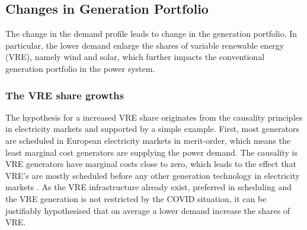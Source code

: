 \documentclass[energies,article,submit,moreauthors,pdftex]{Definitions/mdpi}
\begin{document}



\subsection{Changes in Generation Portfolio}\label{sec:Generation portfolio}
The change in the demand profile leads to change in the generation portfolio. In particular, the lower demand enlarge the shares of variable renewable energy (VRE), namely wind and solar, which further impacts the conventional generation portfolio in the power system. 

\subsubsection{The VRE share growths}
The hypothesis for a increased VRE share originates from the causality principles in electricity markets and supported by a simple example. 
First, most generators are scheduled in European electricity markets in merit-order, which means the least marginal cost generators are supplying the power demand. The causality is VRE generators have marginal costs close to zero, which leads to the effect that VRE's are mostly scheduled before any other generation technology in electricity markets \cite{Winkler2016ImpactMatter}. As the VRE infrastructure already exist, preferred in scheduling and the VRE generation is not restricted by the COVID situation, it can be justifiably hypothesised that on average a lower demand increase the shares of VRE. 
\end{document}
